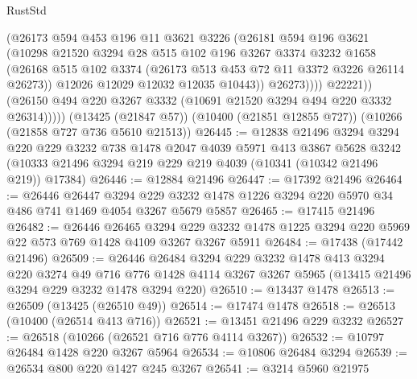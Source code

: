 \begin{lexlean}{RustStd}
\begin{coremodule}
                    (@26173
                      @594
                      @453
                      @196
                      @11
                      @3621
                      @3226
                      (@26181
                        @594
                        @196
                        @3621
                        (@10298
                          @21520
                          @3294
                          @28
                          @515
                          @102
                          @196
                          @3267
                          @3374
                          @3232
                          @1658
                          (@26168
                            @515
                            @102
                            @3374
                            (@26173 @513 @453 @72 @11 @3372 @3226 @26114 @26273))
                          @12026
                          @12029
                          @12032
                          @12035
                          @10443))
                      @26273))))
              @22221))
          (@26150 @494 @220 @3267 @3332 (@10691 @21520 @3294 @494 @220 @3332 @26314)))))
    (@13425 (@21847 @57))
    (@10400 (@21851 @12855 @727))
    (@10266 (@21858 @727 @736 @5610 @21513))
@26445 := @12838
    @21496
    @3294
    @3294
    @220
    @229
    @3232
    @738
    @1478
    @2047
    @4039
    @5971
    @413
    @3867
    @5628
    @3242
    (@10333 @21496 @3294 @219 @229 @219 @4039 (@10341 (@10342 @21496 @219)) @17384)
@26446 := @12884 @21496
@26447 := @17392 @21496
@26464 := @26446
    @26447
    @3294
    @229
    @3232
    @1478
    @1226
    @3294
    @220
    @5970
    @34
    @486
    @741
    @1469
    @4054
    @3267
    @5679
    @5857
@26465 := @17415 @21496
@26482 := @26446
    @26465
    @3294
    @229
    @3232
    @1478
    @1225
    @3294
    @220
    @5969
    @22
    @573
    @769
    @1428
    @4109
    @3267
    @3267
    @5911
@26484 := @17438 (@17442 @21496)
@26509 := @26446
    @26484
    @3294
    @229
    @3232
    @1478
    @413
    @3294
    @220
    @3274
    @49
    @716
    @776
    @1428
    @4114
    @3267
    @3267
    @5965
    (@13415 @21496 @3294 @229 @3232 @1478 @3294 @220)
@26510 := @13437 @1478
@26513 := @26509 (@13425 (@26510 @49))
@26514 := @17474 @1478
@26518 := @26513 (@10400 (@26514 @413 @716))
@26521 := @13451 @21496 @229 @3232
@26527 := @26518 (@10266 (@26521 @716 @776 @4114 @3267))
@26532 := @10797 @26484 @1428 @220 @3267 @5964
@26534 := @10806 @26484 @3294
@26539 := @26534 @800 @220 @1427 @245 @3267
@26541 := @3214 @5960 @21975

\end{coremodule}
\end{lexlean}

